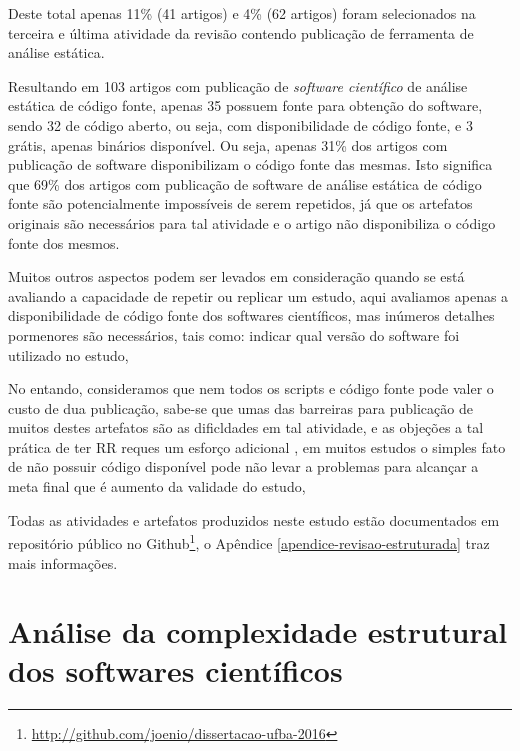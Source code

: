 Deste total apenas 11\% (41 artigos) e 4\% (62 artigos) foram selecionados na
terceira e última atividade da revisão contendo publicação de ferramenta de
análise estática.

Resultando em 103 artigos com publicação de {\it software científico} de
análise estática de código fonte, apenas 35 possuem fonte para obtenção do
software, sendo 32 de código aberto, ou seja, com disponibilidade de
código fonte, e 3 grátis, apenas binários disponível. Ou seja, apenas 31\% dos
artigos com publicação de software disponibilizam o código fonte das mesmas.
Isto significa que 69\% dos artigos com publicação de software de análise
estática de código fonte são potencialmente impossíveis de serem repetidos, já
que os artefatos originais são necessários para tal atividade e o artigo não
disponibiliza o código fonte dos mesmos.


Muitos outros aspectos podem ser levados em consideração quando se está
avaliando a capacidade de repetir ou replicar um estudo, aqui avaliamos apenas
a disponibilidade de código fonte dos softwares científicos, mas inúmeros detalhes
pormenores são necessários, tais como: indicar qual versão do software foi
utilizado no estudo, 

No entando, consideramos que nem todos os scripts e código fonte pode
valer o custo de dua publicação, sabe-se que umas das barreiras para publicação
de muitos destes artefatos são as dificldades em tal atividade,
e as objeções a tal prática de ter RR reques um esforço adicional \cite{madeyski2017would},
em muitos
estudos o simples fato de não possuir código disponível pode não levar
a problemas para alcançar a meta final que é aumento da validade do estudo,


Todas as atividades e artefatos produzidos neste estudo estão documentados em
repositório público no
Github\footnote{\url{http://github.com/joenio/dissertacao-ufba-2016}}, o
Apêndice \ref{apendice-revisao-estruturada} traz mais informações.



\section{Análise da complexidade estrutural dos softwares científicos}

